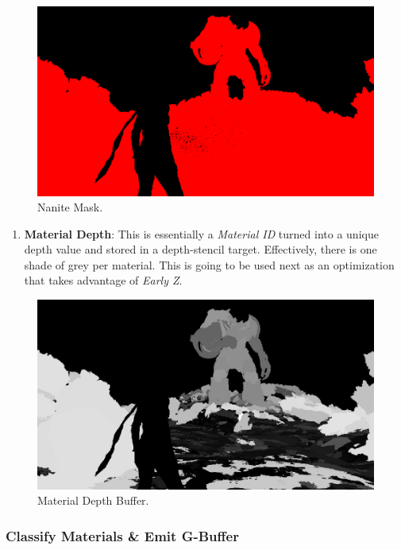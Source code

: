 \documentclass[10pt,journal,compsoc]{IEEEtran}
\newcommand\setItemnumber[1]{\setcounter{enumi}{\numexpr#1-1\relax}}
\begin{document}
\begin{figure}[H]
    \centering
    \includegraphics[scale=0.26]{img/NM.png}
    \caption{Nanite Mask\cite{IGN}.}
    \label{fig:dbf}
\end{figure}

\begin{enumerate}
    \setItemnumber{2}
    \item \textbf{Material Depth}: This is essentially a \textit{Material ID} turned into a unique depth value and stored in a depth-stencil target. Effectively, there is one shade of grey per material. This is going to be used next as an optimization that takes advantage of \textit{Early Z}.
\end{enumerate}

\begin{figure}[H]
    \centering
    \includegraphics[scale=0.26]{img/MDB.png}
    \caption{Material Depth Buffer\cite{IGN}.}
    \label{fig:mdb}
\end{figure}

\subsubsection{Classify Materials \& Emit G-Buffer}
\end{document}
